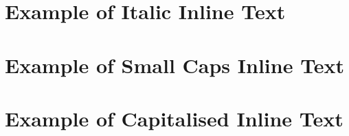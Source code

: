 \section{Example of Italic Inline Text}
\renewcommand{\blindmarkup}[1]{\emph{#1}}
\blindtext


\section{Example of Small Caps Inline Text}
\renewcommand{\blindmarkup}[1]{\textscl{#1}}
\blindtext


\section{Example of Capitalised Inline Text}
\renewcommand{\blindmarkup}[1]{\textsca{#1}}
\blindtext
\renewcommand{\blindmarkup}[1]{}
